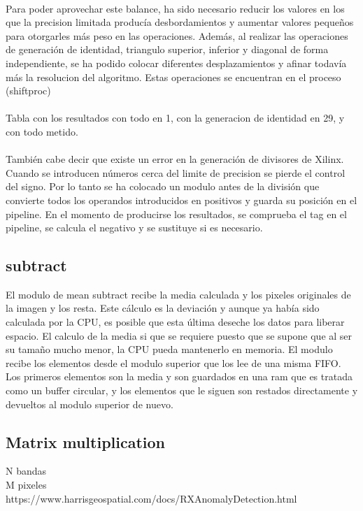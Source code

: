 \\
Para poder aprovechar este balance, ha sido necesario reducir los valores en los que la precision limitada producía desbordamientos y aumentar valores pequeños para otorgarles más peso en las operaciones. Además, al realizar las operaciones de generación de identidad, triangulo superior, inferior y diagonal de forma independiente, se ha podido colocar diferentes desplazamientos y afinar todavía más la resolucion del algoritmo. Estas operaciones se encuentran en el proceso (shiftproc)
\\
\\
Tabla con los resultados con todo en 1, con la generacion de identidad en 29, y con todo metido. 
\\
\\
También cabe decir que existe un error en la generación de divisores de Xilinx. Cuando se introducen números cerca del limite de precision se pierde el control del signo. Por lo tanto se ha colocado un modulo antes de la división que convierte todos los operandos introducidos en positivos y guarda su posición en el pipeline. En el momento de producirse los resultados, se comprueba el tag en el pipeline, se calcula el negativo y se sustituye si es necesario.

\subsection{subtract}
El modulo de mean subtract recibe la media calculada y los pixeles originales de la imagen y los resta. Este cálculo es la deviación y aunque ya había sido calculada por la CPU, es posible que esta última deseche los datos para liberar espacio. El calculo de la media si que se requiere puesto que se supone que al ser su tamaño mucho menor, la CPU pueda mantenerlo en memoria.
El modulo recibe los elementos desde el modulo superior que los lee de una misma FIFO. Los primeros elementos son la media y son guardados en una ram que es tratada como un buffer circular, y los elementos que le siguen son restados directamente y devueltos al modulo superior de nuevo.


\subsection{Matrix multiplication}

N bandas\\
M pixeles\\
https://www.harrisgeospatial.com/docs/RXAnomalyDetection.html\\

